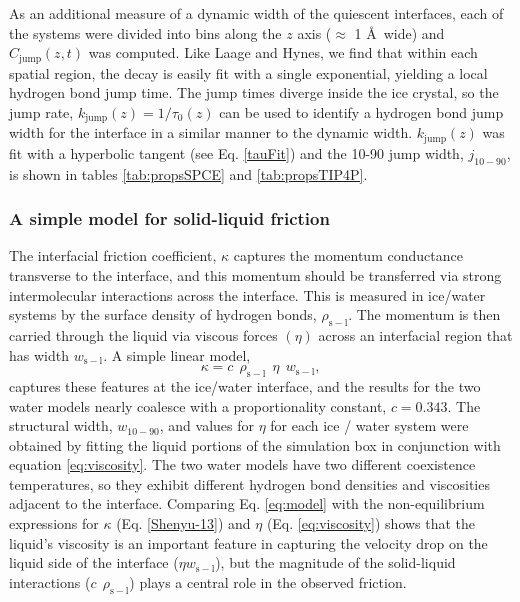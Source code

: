 As an additional measure of a dynamic width of the quiescent
interfaces, each of the systems were divided into bins along the $z$
axis ($\approx$ 1 \AA\ wide) and $C_\mathrm{jump}(z,t)$ was computed.
Like Laage and Hynes, we find that within each spatial region, the
decay is easily fit with a single exponential, yielding a local
hydrogen bond jump time. The jump times diverge inside the ice
crystal, so the jump rate, $k_\mathrm{jump}(z) = 1 / \tau_0(z)$ can be
used to identify a hydrogen bond jump width for the interface in a
similar manner to the dynamic width. $k_\mathrm{jump}(z)$ was fit with
a hyperbolic tangent (see Eq. \eqref{tauFit}) and the 10-90 jump
width, $j_\mathrm{10-90}$, is shown in tables \ref{tab:propsSPCE} and
\ref{tab:propsTIP4P}.

\subsubsection{A simple model for solid-liquid friction}
The interfacial friction coefficient, $\kappa$ captures the momentum
conductance transverse to the interface, and this momentum should be
transferred via strong intermolecular interactions across the
interface. This is measured in ice/water systems by the surface
density of hydrogen bonds, $\rho_\mathrm{s-l}$.  The momentum is then
carried through the liquid via viscous forces $(\eta)$ across an
interfacial region that has width $w_\mathrm{s-l}$. A simple linear
model,
\begin{equation}
  \kappa = c~~\rho_\mathrm{s-l}~~\eta~~w_\mathrm{s-l},
\label{eq:model}
\end{equation}
captures these features at the ice/water interface, and the results
for the two water models nearly coalesce with a proportionality
constant, $c = 0.343$.  The structural width, $w_\mathrm{10-90}$, and
values for $\eta$ for each ice / water system were obtained by fitting
the liquid portions of the simulation box in conjunction with equation
\eqref{eq:viscosity}.  The two water models have two different
coexistence temperatures, so they exhibit different hydrogen bond
densities and viscosities adjacent to the interface.  Comparing
Eq. \eqref{eq:model} with the non-equilibrium expressions for $\kappa$
(Eq. \eqref{Shenyu-13}) and $\eta$ (Eq. \eqref{eq:viscosity}) shows
that the liquid's viscosity is an important feature in capturing the
velocity drop on the liquid side of the interface
($\eta w_\mathrm{s-l}$), but the magnitude of the solid-liquid
interactions ($c~~\rho_\mathrm{s-l}$) plays a central role in the
observed friction.

